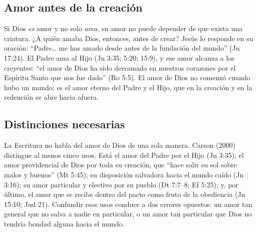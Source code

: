 
\subsection{Amor antes de la creación}
Si Dios \emph{es} amor y no solo \emph{ama}, su amor no puede depender de que exista una criatura. ¿A quién amaba Dios, entonces, antes de crear? Jesús lo responde en su oración: ``Padre\ldots{} me has amado desde antes de la fundación del mundo'' (Jn 17:24). El Padre ama al Hijo (Jn 3:35; 5:20; 15:9), y ese amor alcanza a los creyentes: ``el amor de Dios ha sido derramado en nuestros corazones por el Espíritu Santo que nos fue dado'' (Ro 5:5). El amor de Dios no comenzó cuando hubo un mundo; es el amor eterno del Padre y el Hijo, que en la creación y en la redención se abre hacia afuera.


\subsection{Distinciones necesarias}
La Escritura no habla del amor de Dios de una sola manera. Carson (2000) distingue al menos cinco usos. Está el amor del Padre por el Hijo (Jn 3:35); el amor providencial de Dios por toda su creación, que ``hace salir su sol sobre malos y buenos'' (Mt 5:45); su disposición salvadora hacia el mundo caído (Jn 3:16); su amor particular y electivo por su pueblo (Dt 7:7--8; Ef 5:25); y, por último, el amor que se recibe dentro del pacto como fruto de la obediencia (Jn 15:10; Jud 21). Confundir esos usos conduce a dos errores opuestos: un amor tan general que no salva a nadie en particular, o un amor tan particular que Dios no tendría bondad alguna hacia el mundo.




